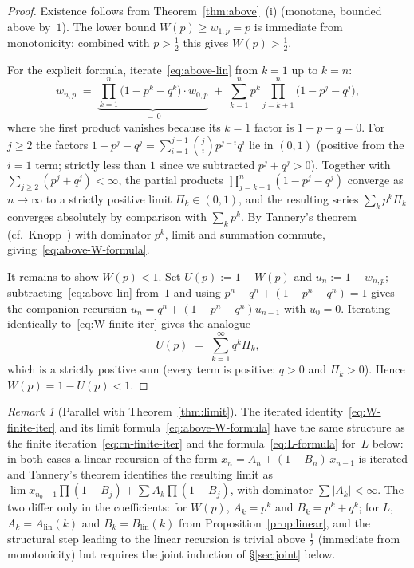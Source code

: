 \documentclass[12pt]{article}
\theoremstyle{definition}
\theoremstyle{remark}
\newtheorem{remark}[theorem]{Remark}
\begin{document}
\begin{proof}
  Existence follows from Theorem~\ref{thm:above}~(i) (monotone,
  bounded above by~$1$).  The lower bound $W(p)\ge w_{1,p}=p$ is
  immediate from monotonicity; combined with $p>\tfrac12$ this
  gives $W(p)>\tfrac12$.

  For the explicit formula, iterate~\eqref{eq:above-lin} from
  $k=1$ up to $k=n$:
  \begin{equation}\label{eq:W-finite-iter}
    w_{n,p} \;=\; \underbrace{\prod_{k=1}^n\!\bigl(1-p^k-q^k\bigr)
                               \cdot w_{0,p}}_{=\,0}
    \;+\; \sum_{k=1}^n p^k\!\prod_{j=k+1}^n\!\bigl(1-p^j-q^j\bigr),
  \end{equation}
  where the first product vanishes because its $k=1$ factor is
  $1-p-q=0$.  For $j\ge 2$ the factors
  $1-p^j-q^j=\sum_{i=1}^{j-1}\binom{j}{i}p^{j-i}q^i$ lie in $(0,1)$
  (positive from the $i=1$ term; strictly less than $1$ since we
  subtracted $p^j+q^j>0$).  Together with
  $\sum_{j\ge 2}(p^j+q^j)<\infty$, the partial products
  $\prod_{j=k+1}^n(1-p^j-q^j)$ converge as $n\to\infty$ to a
  strictly positive limit $\Pi_k\in(0,1)$, and the resulting
  series $\sum_k p^k\Pi_k$ converges absolutely by comparison with
  $\sum_k p^k$.  By Tannery's theorem
  (cf.~Knopp~\cite[\S 41]{Knopp1990}) with dominator $p^k$, limit
  and summation commute, giving~\eqref{eq:above-W-formula}.

  It remains to show $W(p)<1$.  Set $U(p):=1-W(p)$ and
  $u_n:=1-w_{n,p}$; subtracting~\eqref{eq:above-lin} from~$1$ and
  using $p^n+q^n+(1-p^n-q^n)=1$ gives the companion recursion
  $u_n=q^n+(1-p^n-q^n)u_{n-1}$ with $u_0=0$.
  Iterating identically to~\eqref{eq:W-finite-iter} gives the
  analogue
  \[
    U(p) \;=\; \sum_{k=1}^\infty q^k\Pi_k,
  \]
  which is a strictly positive sum (every term is positive: $q>0$
  and $\Pi_k>0$).  Hence $W(p)=1-U(p)<1$.
\end{proof}

\begin{remark}[Parallel with Theorem~\ref{thm:limit}]\label{rem:above-vs-below}
  The iterated identity~\eqref{eq:W-finite-iter} and its limit
  formula~\eqref{eq:above-W-formula} have the same structure as
  the finite iteration~\eqref{eq:cn-finite-iter} and the
  formula~\eqref{eq:L-formula} for~$L$ below: in both cases a
  linear recursion of the form $x_n=A_n+(1-B_n)\,x_{n-1}$ is
  iterated and Tannery's theorem identifies the resulting limit
  as $\lim x_{n_0-1}\prod(1-B_j)+\sum A_k\prod(1-B_j)$, with
  dominator $\sum|A_k|<\infty$.  The two differ only in the
  coefficients: for $W(p)$, $A_k=p^k$ and $B_k=p^k+q^k$; for
  $L$, $A_k=A_{\mathrm{lin}}(k)$ and $B_k=B_{\mathrm{lin}}(k)$
  from Proposition~\ref{prop:linear}, and the structural step
  leading to the linear recursion is trivial above $\tfrac12$
  (immediate from monotonicity) but requires the joint induction
  of \S\ref{sec:joint} below.
\end{remark}
\end{document}

